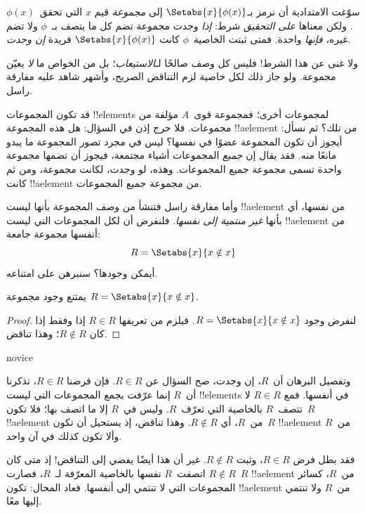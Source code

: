 \documentclass[../../../include/open-logic-section]{subfiles}
\begin{document}

سوّغت الامتدادية أن نرمز بـ$\Setabs{x}{\phi(x)}$ إلى \emph{مجموعة}
قيم $x$ التي تحقق~$\phi(x)$. ولكن معناها \emph{على التحقيق} شرط:
\emph{إذا} وجدت مجموعة تضم كل ما يتصف بـ~$\phi$ ولا تضم غيره،
\emph{فإنها} واحدة. فمتى ثبتت الخاصية~$\phi$ كانت
$\Setabs{x}{\phi(x)}$ فريدة \emph{إن وجدت}.

ولا غنى عن هذا الشرط!{} فليس كل وصف صالحًا لـ\emph{الاستيعاب}؛
بل من الخواص ما \emph{لا} يعيّن مجموعة. ولو جاز ذلك لكل خاصية لزم
التناقض الصريح، وأشهر شاهد عليه مفارقة راسل.

قد تكون المجموعات !!{element}s لمجموعات أخرى؛ فمجموعة قوى~$A$ مؤلفة
من مجموعات. فلا حرج إذن في السؤال: هل هذه المجموعة !!a{element}
من تلك؟ ثم نسأل: أيجوز أن تكون المجموعة عضوًا في نفسها؟
ليس في مجرد تصور المجموعة ما يبدو مانعًا منه. فقد يقال إن
\emph{جميع} المجموعات أشياء مجتمعة، فيجوز أن تضمها مجموعة واحدة
تسمى مجموعة جميع المجموعات. وهذه، لو وجدت، لكانت مجموعة، ومن ثم
كانت !!a{element} من مجموعة جميع المجموعات.

وأما مفارقة راسل فتنشأ من وصف المجموعة بأنها ليست !!a{element} من
نفسها، أي بأنها \emph{غير منتمية إلى نفسها}. فلنفرض أن لكل
المجموعات التي ليست !!a{element} من أنفسها مجموعة جامعة:
\[
R = \Setabs{x}{x \notin x}
\]
أيمكن وجودها؟ سنبرهن على امتناعه.

\begin{thm}
يمتنع وجود مجموعة $R = \Setabs{x}{x \notin x}$.
\end{thm}

\begin{proof}
لنفرض وجود $R = \Setabs{x}{x \notin x}$. فيلزم من تعريفها
$R \in R$ إذا وفقط إذا كان $R \notin R$؛ وهذا تناقض.
\end{proof}

\begin{tagblock}{novice}
\begin{explain}
وتفصيل البرهان أن~$R$، إن وجدت، صح السؤال عن $R \in R$.
فإن فرضنا $R \in R$، تذكرنا أن~$R$ إنما عرّفت بجمع المجموعات التي
ليست !!{element}s في أنفسها. فمع $R \in R$ لا تتصف~$R$ بالخاصية
التي تعرّف~$R$. وليس في~$R$ إلا ما اتصف بها؛ فلا تكون~$R$
!!a{element} من~$R$، أي $R \notin R$. وهذا تناقض، إذ يستحيل
أن تكون~$R$ !!a{element} من~$R$ وألا تكون كذلك في آن واحد.

فقد بطل فرض $R \in R$، وثبت $R \notin R$. غير أن هذا أيضًا
يفضي إلى التناقض!{} إذ متى كان $R \notin R$ اتصفت~$R$ نفسها
بالخاصية المعرّفة لـ~$R$، فصارت~$R$ !!a{element} من~$R$، كسائر
المجموعات التي لا تنتمي إلى أنفسها. فعاد المحال: تكون !!a{element}
من~$R$ ولا تنتمي إليها معًا.
\end{explain}
\end{tagblock}
\end{document}
